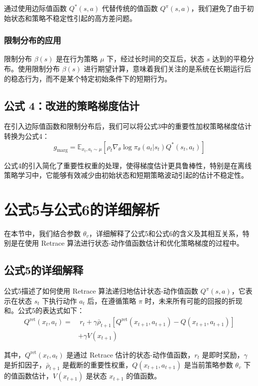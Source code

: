 \documentclass[twocolumn, 10pt]{article} %
\theoremstyle{remark}
\begin{document}
通过使用边际值函数 \( Q^*(s, a) \) 代替传统的值函数 \( Q^\pi(s, a) \)，我们避免了由于初始状态和策略不稳定性引起的高方差问题。

\subsubsection{限制分布的应用}

限制分布 \( \beta(s) \) 是在行为策略 \( \mu \) 下，经过长时间的交互后，状态 \( s \) 达到的平稳分布。使用限制分布 \( \beta(s) \) 进行期望计算，意味着我们关注的是系统在长期运行后的稳态行为，而不是某个特定初始条件下的短期行为。

\subsection{公式 4：改进的策略梯度估计}

在引入边际值函数和限制分布后，我们可以将公式3中的重要性加权策略梯度估计转换为公式4：
\[
g_{\text{marg}} = \mathbb{E}_{x_t, a_t \sim \mu} \left[ \rho_t \nabla_\theta \log \pi_\theta(a_t | s_t) Q^*(s_t, a_t) \right]
\]

公式4的引入简化了重要性权重的处理，使得梯度估计更具鲁棒性，特别是在离线策略学习中，它能够有效减少由初始状态和短期策略波动引起的估计不稳定性。



\section{公式5与公式6的详细解析}

在本节中，我们结合参数 \(\theta_v\)，详细解释了公式5和公式6的含义及其相互关系，特别是在使用 Retrace 算法进行状态-动作值函数估计和优化策略梯度的过程中。

\subsection{公式5的详细解释}

公式5描述了如何使用 Retrace 算法递归地估计状态-动作值函数 \( Q^{\pi}(s, a) \)，它表示在状态 \( s_t \) 下执行动作 \( a_t \) 后，在遵循策略 \( \pi \) 时，未来所有可能的回报的折现和。公式5的表达式如下：
\[
\begin{aligned}
Q^{\text{ret}}(x_t, a_t) = &\ r_t + \gamma \bar{\rho}_{t+1} \left[ Q^{\text{ret}}(x_{t+1}, a_{t+1}) - Q(x_{t+1}, a_{t+1}) \right] \\
& + \gamma V(x_{t+1})
\end{aligned}
\]


其中，\( Q^{\text{ret}}(x_t, a_t) \) 是通过 Retrace 估计的状态-动作值函数，\( r_t \) 是即时奖励，\( \gamma \) 是折扣因子，\( \bar{\rho}_{t+1} \) 是截断的重要性权重，\( Q(x_{t+1}, a_{t+1}) \) 是当前策略参数 \(\theta_v\) 下的值函数估计，\( V(x_{t+1}) \) 是状态 \( x_{t+1} \) 的值函数。
\end{document}
